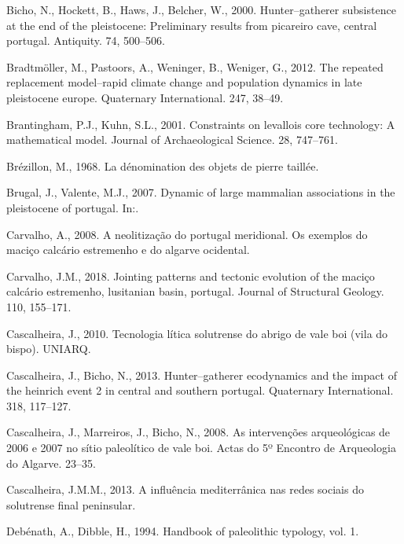\documentclass[12pt,twoside]{reedthesis}
\begin{document}
\leavevmode\hypertarget{ref-bichoetal2000}{}%
Bicho, N., Hockett, B., Haws, J., Belcher, W., 2000. Hunter--gatherer subsistence at the end of the pleistocene: Preliminary results from picareiro cave, central portugal. Antiquity. 74, 500--506.

\leavevmode\hypertarget{ref-bradtmoller2012}{}%
Bradtmöller, M., Pastoors, A., Weninger, B., Weniger, G., 2012. The repeated replacement model--rapid climate change and population dynamics in late pleistocene europe. Quaternary International. 247, 38--49.

\leavevmode\hypertarget{ref-brantingham2001}{}%
Brantingham, P.J., Kuhn, S.L., 2001. Constraints on levallois core technology: A mathematical model. Journal of Archaeological Science. 28, 747--761.

\leavevmode\hypertarget{ref-brezillon1968}{}%
Brézillon, M., 1968. La dénomination des objets de pierre taillée.

\leavevmode\hypertarget{ref-brugal2007}{}%
Brugal, J., Valente, M.J., 2007. Dynamic of large mammalian associations in the pleistocene of portugal. In:.

\leavevmode\hypertarget{ref-carvalho2008}{}%
Carvalho, A., 2008. A neolitização do portugal meridional. Os exemplos do maciço calcário estremenho e do algarve ocidental.

\leavevmode\hypertarget{ref-carvalho2018}{}%
Carvalho, J.M., 2018. Jointing patterns and tectonic evolution of the maciço calcário estremenho, lusitanian basin, portugal. Journal of Structural Geology. 110, 155--171.

\leavevmode\hypertarget{ref-cascalheira2010}{}%
Cascalheira, J., 2010. Tecnologia lítica solutrense do abrigo de vale boi (vila do bispo). UNIARQ.

\leavevmode\hypertarget{ref-cascalheiraandbicho2013}{}%
Cascalheira, J., Bicho, N., 2013. Hunter--gatherer ecodynamics and the impact of the heinrich event 2 in central and southern portugal. Quaternary International. 318, 117--127.

\leavevmode\hypertarget{ref-cascalheiraetal2008}{}%
Cascalheira, J., Marreiros, J., Bicho, N., 2008. As intervenções arqueológicas de 2006 e 2007 no sítio paleolítico de vale boi. Actas do 5º Encontro de Arqueologia do Algarve. 23--35.

\leavevmode\hypertarget{ref-cascalheira2013}{}%
Cascalheira, J.M.M., 2013. A influência mediterrânica nas redes sociais do solutrense final peninsular.

\leavevmode\hypertarget{ref-debenath1994}{}%
Debénath, A., Dibble, H., 1994. Handbook of paleolithic typology, vol. 1.
\end{document}
